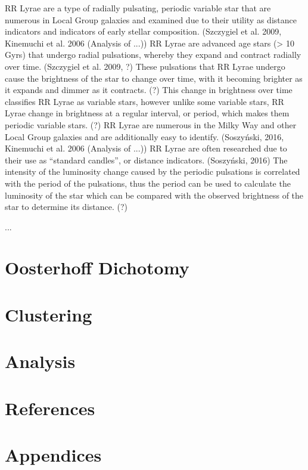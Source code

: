 \documentclass[]{article}
\begin{document}
RR Lyrae are a type of radially pulsating, periodic variable star that are numerous in Local Group galaxies and examined due to their utility as distance indicators and indicators of early stellar composition. (Szczygiel et al. 2009, Kinemuchi et al. 2006 (Analysis of ...)) RR Lyrae are advanced age stars (> 10 Gyrs) that undergo radial pulsations, whereby they expand and contract radially over time. (Szczygiel et al. 2009, ?) These pulsations that RR Lyrae undergo cause the brightness of the star to change over time, with it becoming brighter as it expands and dimmer as it contracts. (?) This change in brightness over time classifies RR Lyrae as variable stars, however unlike some variable stars, RR Lyrae change in brightness at a regular interval, or period, which makes them periodic variable stars. (?) RR Lyrae are numerous in the Milky Way and other Local Group galaxies and are additionally easy to identify. (Soszyński, 2016, Kinemuchi et al. 2006 (Analysis of ...)) RR Lyrae are often researched due to their use as “standard candles”, or distance indicators.\cite{2016AcA....66..131S} (Soszyński, 2016) The intensity of the luminosity change caused by the periodic pulsations is correlated with the period of the pulsations, thus the period can be used to calculate the luminosity of the star which can be compared with the observed brightness of the star to determine its distance. (?)

...

\newpage

\section{Oosterhoff Dichotomy}

\newpage

\section{Clustering}

\newpage

\section{Analysis}

\newpage

\section{References}

 


\newpage

\section{Appendices}
\end{document}
